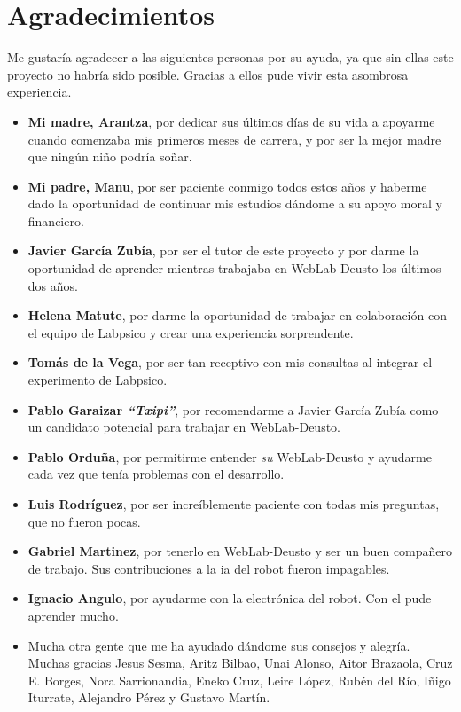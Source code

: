 \chapter*{Agradecimientos}

Me gustaría agradecer a las siguientes personas por su ayuda, ya que sin ellas este proyecto no
habría sido posible. Gracias a ellos pude vivir esta asombrosa experiencia.

\begin{itemize}
	\item \textbf{Mi madre, Arantza}, por dedicar sus últimos días de su vida a apoyarme cuando
	comenzaba mis primeros meses de carrera, y por ser la mejor madre que ningún niño podría soñar.

	\item \textbf{Mi padre, Manu}, por ser paciente conmigo todos estos años y haberme dado la
	oportunidad de continuar mis estudios dándome a su apoyo moral y financiero.

	\item \textbf{Javier García Zubía}, por ser el tutor de este proyecto y por darme la oportunidad
	de aprender mientras trabajaba en WebLab-Deusto los últimos dos años.

	\item \textbf{Helena Matute}, por darme la oportunidad de trabajar en colaboración con el equipo
	de Labpsico y crear una experiencia sorprendente.

	\item \textbf{Tomás de la Vega}, por ser tan receptivo con mis consultas al integrar el
	experimento de Labpsico.

	\item \textbf{Pablo Garaizar \emph{``Txipi''}}, por recomendarme a Javier García Zubía como un
	candidato potencial para trabajar en WebLab-Deusto.

	\item \textbf{Pablo Orduña}, por permitirme entender \emph{su} WebLab-Deusto y ayudarme cada
	vez que tenía problemas con el desarrollo.

	\item \textbf{Luis Rodríguez}, por ser increíblemente paciente con todas mis preguntas, que no
	fueron pocas.

	\item \textbf{Gabriel Martinez}, por tenerlo en WebLab-Deusto y ser un buen compañero de
	trabajo. Sus contribuciones a la \acrshort{ia} del robot fueron impagables.

	\item \textbf{Ignacio Angulo}, por ayudarme con la electrónica del robot. Con el pude aprender
	mucho.

	\item Mucha otra gente que me ha ayudado dándome sus consejos y alegría. Muchas gracias Jesus
	Sesma, Aritz Bilbao, Unai Alonso, Aitor Brazaola, Cruz E. Borges, Nora Sarrionandia, Eneko Cruz,
	Leire López, Rubén del Río, Iñigo Iturrate, Alejandro Pérez y Gustavo Martín.
\end{itemize}
